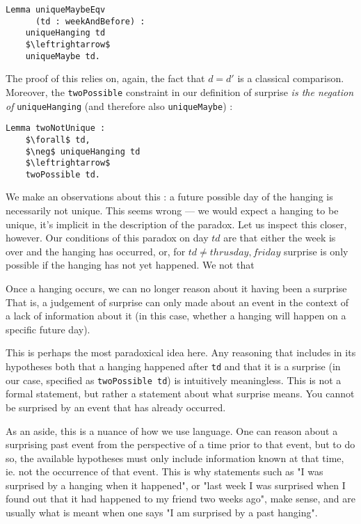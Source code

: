 \documentclass[journal]{journal}
\begin{document}
\begin{lstlisting}[mathescape=true]
  Lemma uniqueMaybeEqv
      (td : weekAndBefore) :
    uniqueHanging td
    $\leftrightarrow$
    uniqueMaybe td.
\end{lstlisting}

The proof of this relies on, again, the fact that $d = d'$ is a classical
comparison. Moreover, the {\tt twoPossible} constraint
in our definition of surprise \emph{is the negation of} {\tt uniqueHanging}
(and therefore also {\tt uniqueMaybe}) :

\begin{lstlisting}[mathescape=true]
  Lemma twoNotUnique :
    $\forall$ td,
    $\neg$ uniqueHanging td
    $\leftrightarrow$
    twoPossible td.
\end{lstlisting}

We make an observations about this : a future possible day of the hanging is
necessarily not unique. This seems wrong --- we would expect a hanging to be
unique, it's implicit in the
description of the paradox. Let us inspect this closer, however.
Our conditions of this paradox on day $td$ are that either
the week is over and the hanging has occurred, or, for $td \neq thrusday, friday$ surprise is
only possible if the hanging has not yet happened. We not that

Once a hanging occurs, we can no longer reason about it having been a surprise
That is, a judgement of surprise can only made about
an event in the context of a lack of information about it (in this case,
whether a hanging will happen on a specific future day).

This is perhaps the most paradoxical idea here. Any reasoning that includes
in its hypotheses both that a hanging happened after {\tt td} and that it is a surprise
(in our case, specified as {\tt twoPossible td}) is intuitively meaningless. This is not a
formal statement, but rather a statement about what surprise means. You cannot
be surprised by an event that has already occurred.

As an aside, this is a nuance of how we use language. One can reason about a surprising past
event from the perspective of a time prior to that event, but to do so,
the available hypotheses must only include information known at that time, ie.
not the occurrence of that event. This is why statements such as "I was surprised
by a hanging when it happened", or "last week I was surprised when I found out
that it had happened to my friend two weeks ago", make sense, and are usually
what is meant when one says "I am surprised by a past hanging".
\end{document}
